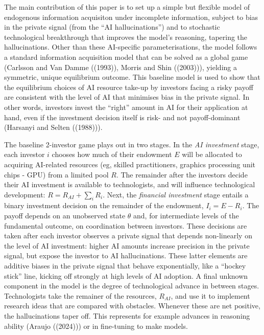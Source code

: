 \documentclass[
]{article}
\theoremstyle{plain}
\theoremstyle{definition}
\theoremstyle{remark}
\begin{document}
The main contribution of this paper is to set up a simple but flexible
model of endogenous information acquisiton under incomplete information,
subject to bias in the private signal (from the ``AI hallucinations'')
and to stochastic technological breakthrough that improves the model's
reasoning, tapering the hallucinations. Other than these AI-specific
parameterisations, the model follows a standard information acquisition
model that can be solved as a global game (Carlsson and Van Damme
((1993)), Morris and Shin ((2003))), yielding a symmetric, unique
equilibrium outcome. This baseline model is used to show that the
equilibrium choices of AI resource take-up by investors facing a risky
payoff are consistent with the level of AI that minimises bias in the
private signal. In other words, investors invest the ``right'' amount in
AI for their application at hand, even if the investment decision itself
is risk- and not payoff-dominant (Harsanyi and Selten ((1988))).

The baseline 2-investor game plays out in two stages. In the \emph{AI
investment} stage, each investor \(i\) chooses how much of their
endowment \(E\) will be allocated to acquiring AI-related resources (eg,
skilled practitioners, graphics processing unit chips - GPU) from a
limited pool \(R\). The remainder after the investors decide their AI
investment is available to technologists, and will influence
technological development: \(R = R_{AI} + \sum_i R_i\). Next, the
\emph{financial investment} stage entails a binary investment decision
on the remainder of the endowment, \(I_i = E - R_i\). The payoff depends
on an unobserved state \(\theta\) and, for intermediate levels of the
fundamental outcome, on coordination between investors. These decisions
are taken after each investor observes a private signal that depends
non-linearly on the level of AI investment: higher AI amounts increase
precision in the private signal, but expose the investor to AI
hallucinations. These latter elements are additive biases in the private
signal that behave exponentially, like a ``hockey stick'' line, kicking
off strongly at high levels of AI adoption. A final unknown component in
the model is the degree of technological advance in between stages.
Technologists take the remainer of the resources, \(R_{AI}\), and use it
to implement research ideas that are compared with obstacles. Whenever
these are net positive, the hallucinations taper off. This represents
for example advances in reasoning ability (Araujo ((2024))) or in
fine-tuning to make models.
\end{document}
